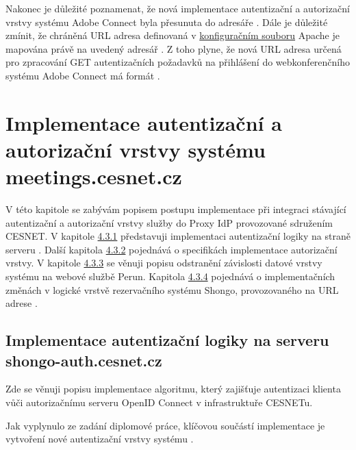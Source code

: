 \documentclass[
  printed, %
  twoside, %
  table,   %
  nolof,     %
  nolot,     %
]{fithesis3}
\begin{document}
\par 
Nakonec je důležité poznamenat, že nová implementace autentizační a autorizační vrstvy systému Adobe Connect byla přesunuta do adresáře . Dále je důležité zmínit, že chráněná URL adresa definovaná v \hyperref[ac-location]{konfiguračním souboru} Apache je mapována právě na uvedený adresář . Z toho plyne, že nová URL adresa určená pro zpracování GET autentizačních požadavků na přihlášení do webkonferenčního systému Adobe Connect má formát .


\section[Implementace autentizační a autorizační vrstvy systému\break meetings.cesnet.cz]{Implementace autentizační a autorizační vrstvy systému meetings.cesnet.cz}
\label{ShongoImpl}
V této kapitole se zabývám popisem postupu implementace při integraci stávající autentizační a autorizační vrstvy služby  do Proxy IdP provozované sdružením CESNET. V kapitole \hyperref[ShongoImpl-authn]{4.3.1} představuji implementaci autentizační logiky na straně serveru . Další kapitola \hyperref[ShongoImpl-authr]{4.3.2} pojednává o specifikách implementace autorizační vrstvy. V kapitole \hyperref[zpracovaniAUlozeniPerun]{4.3.3} se věnuji popisu odstranění závislosti datové vrstvy systému  na webové službě Perun. Kapitola \hyperref[ShongoImpl-web]{4.3.4} pojednává o implementačních změnách v logické vrstvě rezervačního systému Shongo, provozovaného na URL adrese . 

\subsection{Implementace autentizační logiky na serveru shongo-auth.cesnet.cz}
\label{ShongoImpl-authn}    

Zde se věnuji popisu implementace algoritmu, který zajišťuje autentizaci klienta  vůči autorizačnímu serveru OpenID Connect v infrastruktuře CESNETu.  

\par

Jak vyplynulo ze zadání diplomové práce, klíčovou součástí implementace je vytvoření nové autentizační vrstvy systému .
\par
\end{document}

